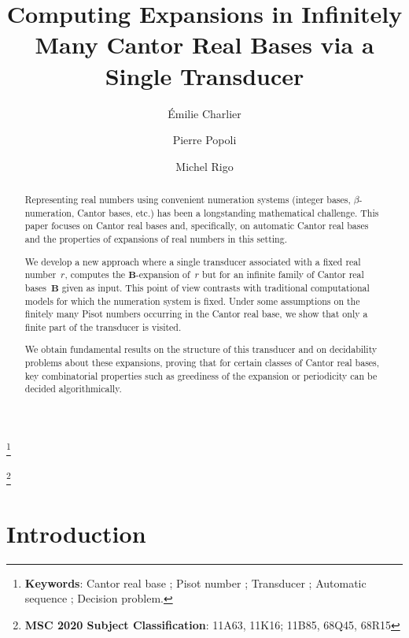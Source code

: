 \documentclass[12pt,reqno]{amsart}
\newcommand\nnfootnote[1]{%
  \begin{NoHyper}
  \renewcommand\thefootnote{}\footnote{#1}%
  \addtocounter{footnote}{-1}%
  \end{NoHyper}
}
\begin{document}
\title[Computing Expansions Cantor Real Bases via a Transducer]{Computing Expansions in Infinitely Many Cantor Real Bases via a Single Transducer}

\author[\'{E}. Charlier]{\'{E}milie Charlier}
\author[P. Popoli]{Pierre Popoli}
\author[M. Rigo]{Michel Rigo}

\address{Department of Mathematics, ULiège, Liège, Belgium}

\begin{abstract}
Representing real numbers using convenient numeration systems (integer bases, $\beta$-numeration, Cantor bases, etc.) has been a longstanding mathematical challenge. This paper focuses on Cantor real bases and, specifically, on automatic Cantor real bases and the properties of expansions of real numbers in this setting. 

We develop a new approach where a single transducer associated with a fixed real number~$r$, computes the $\mathbf{B}$-expansion of~$r$ but for an infinite family of Cantor real bases~$\mathbf{B}$ given as input. This point of view contrasts with traditional computational models for which the numeration system is fixed. Under some assumptions on the finitely many Pisot numbers occurring in the Cantor real base, we show that only a finite part of the transducer is visited. 

We obtain fundamental results on the structure of this transducer and on decidability problems about these expansions, proving that for certain classes of Cantor real bases, key combinatorial properties such as greediness of the expansion or periodicity can be decided algorithmically.
\end{abstract}

\maketitle

\nnfootnote{\textbf{Keywords}: Cantor real base ; Pisot number ; Transducer ; Automatic sequence ; Decision problem.}

\nnfootnote{\textbf{MSC 2020 Subject Classification}: 11A63, 11K16; 11B85, 68Q45, 68R15}

\setcounter{tocdepth}{1}
\tableofcontents

\section{Introduction}
\end{document}
